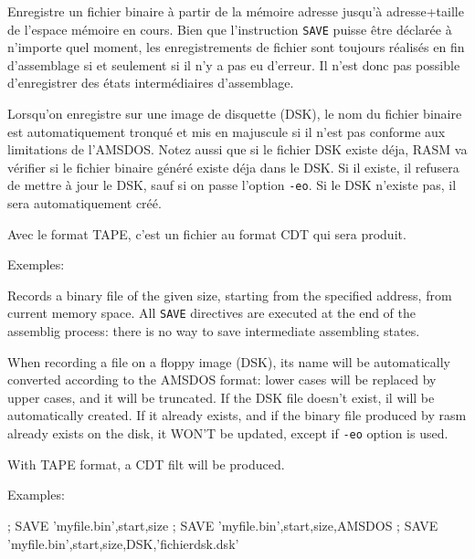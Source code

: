 \begin{xfr}
Enregistre un fichier binaire à partir de la mémoire adresse jusqu'à adresse+taille de l'espace mémoire en cours. Bien que l'instruction \texttt{SAVE} puisse être déclarée à n'importe quel moment, les enregistrements de fichier sont toujours réalisés en fin d'assemblage si et seulement si il n'y a pas eu d'erreur. Il n'est donc pas possible d'enregistrer des états intermédiaires d'assemblage.

Lorsqu'on enregistre sur une image de disquette (DSK), le nom du fichier binaire est automatiquement tronqué et mis en majuscule si il n'est pas conforme aux limitations de l'AMSDOS.
Notez aussi que si le fichier DSK existe déja, RASM va vérifier si le fichier binaire généré existe déja dans le DSK. Si il existe, il refusera de mettre à jour le DSK, sauf si on passe l'option \texttt{-eo}. Si le DSK n'existe pas, il sera automatiquement créé.

Avec le format TAPE, c'est un fichier au format CDT qui sera produit.

Exemples:
\end{xfr}

\begin{xen}
Records a binary file of the given size, starting from the specified address, from current memory space. All \texttt{SAVE} directives are executed at the end of the assemblig process: there is no way to save intermediate assembling states.

When recording a file on a floppy image (DSK), its name will be automatically converted according to the AMSDOS format: lower cases will be replaced by upper cases, and it will be truncated.
If the DSK file doesn't exist, il will be automatically created. If it already exists, and if the binary file produced by rasm already exists on the disk, it WON'T be updated, except if \texttt{-eo} option is used.

With TAPE format, a CDT filt will be produced.

Examples:
\end{xen}

\begin{code}
;
SAVE 'myfile.bin',start,size
\medskip
;
SAVE 'myfile.bin',start,size,AMSDOS
\medskip
;
SAVE 'myfile.bin',start,size,DSK,'fichierdsk.dsk'
\end{code}

